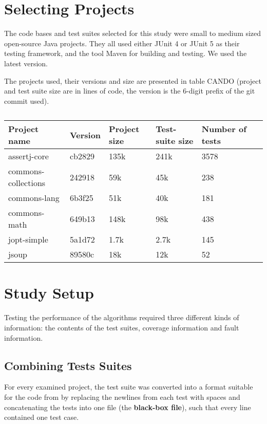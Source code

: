 \section{Selecting Projects}

The code bases and test suites selected for this study were small to
medium sized open-source Java projects. They all used either JUnit
4 or JUnit 5 as their testing framework, and the tool Maven %
for building and testing. We used the latest version.

The projects used, their versions and size are presented in table CANDO
(project and test suite size are in lines of code, the version is the
6-digit prefix of the git commit used).

\begin{table}[htpb]
	\caption[]{}\label{tab:projects} %
	\centering
	\begin{tabular}{l l l l l l}
		\toprule
		Project name & Version & Project size & Test-suite size & Number of tests \\
		\midrule
		assertj-core & cb2829 & 135k & 241k &3578 \\
		commons-collections & 242918 & 59k & 45k & 238 \\
		commons-lang & 6b3f25 & 51k & 40k & 181 \\
		commons-math & 649b13 & 148k & 98k & 438 \\
		jopt-simple & 5a1d72 & 1.7k & 2.7k & 145 \\
		jsoup & 89580c & 18k & 12k & 52\\
		\bottomrule
	\end{tabular}
\end{table}


\section{Study Setup}

Testing the performance of the algorithms required three different kinds
of information: the contents of the test suites, coverage information
and fault information.

\subsection{Combining Tests Suites}

For every examined project, the test suite was converted into a format
suitable for the code from \cite{cruciani2019scalable} by replacing the
newlines from each test with spaces and concatenating the tests into
one file (the \textbf{black-box file}), such that every line contained
one test case.

